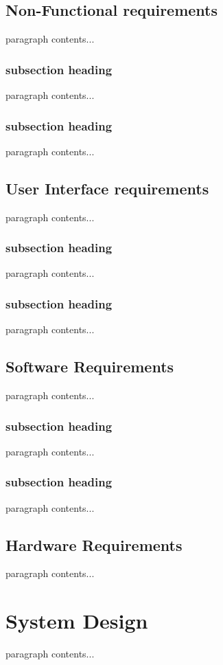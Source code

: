 \documentclass[12pt,a4paper]{report}
\begin{document}
\section{Non-Functional requirements}
paragraph contents... 

\subsection{subsection heading}
paragraph contents... 


\subsection{subsection heading}
paragraph contents... 
\section{User Interface requirements}
paragraph contents... 
\subsection{subsection heading}
paragraph contents... 
\subsection{subsection heading}
paragraph contents... 
\section{Software Requirements }
paragraph contents... 
\subsection{subsection heading}
paragraph contents... 
\subsection{subsection heading}
paragraph contents... 
\section{Hardware Requirements }
paragraph contents... 


\chapter{System Design}
paragraph contents... 
\end{document}
